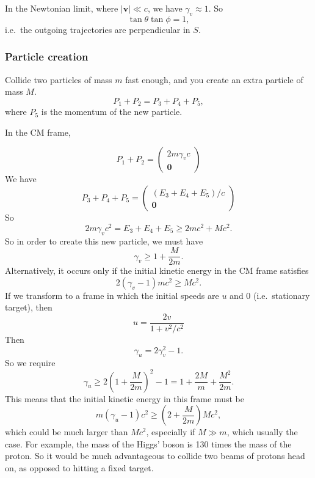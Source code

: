 \documentclass[a4paper]{article}
\begin{document}
In the Newtonian limit, where $|\mathbf{v}| \ll c$, we have $\gamma_v \approx 1$. So
\[
  \tan \theta\tan \phi = 1,
\]
i.e.\ the outgoing trajectories are perpendicular in $S$.

\subsubsection*{Particle creation}
Collide two particles of mass $m$ fast enough, and you create an extra particle of mass $M$.
\[
  P_1 + P_2 = P_3 + P_4 + P_5,
\]
where $P_5$ is the momentum of the new particle.

In the CM frame,
\begin{center}
\end{center}
\[
  P_1 + P_2 =
  \begin{pmatrix}
    2m\gamma_v c\\
    \mathbf{0}
  \end{pmatrix}
\]
We have
\[
  P_3 + P_4 + P_5 =
  \begin{pmatrix}
    (E_3 + E_4 + E_5)/c\\
    \mathbf{0}
  \end{pmatrix}
\]
So
\[
  2m\gamma_v c^2 = E_3 + E_4 + E_5 \geq 2mc^2 + Mc^2.
\]
So in order to create this new particle, we must have
\[
  \gamma_v \geq 1 + \frac{M}{2m}.
\]
Alternatively, it occurs only if the initial kinetic energy in the CM frame satisfies
\[
  2(\gamma_v - 1)mc^2 \geq Mc^2.
\]
If we transform to a frame in which the initial speeds are $u$ and 0 (i.e.\ stationary target), then
\[
  u = \frac{2v}{1 + v^2/c^2}
\]
Then
\[
  \gamma_u = 2\gamma_v^2 - 1.
\]
So we require
\[
  \gamma_u \geq 2\left(1 + \frac{M}{2m}\right)^2 - 1 = 1 + \frac{2M}{m} + \frac{M^2}{2m}.
\]
This means that the initial kinetic energy in this frame must be
\[
  m(\gamma_u - 1)c^2 \geq \left(2 + \frac{M}{2m}\right)Mc^2,
\]
which could be much larger than $Mc^2$, especially if $M\gg m$, which usually the case. For example, the mass of the Higgs' boson is 130 times the mass of the proton. So it would be much advantageous to collide two beams of protons head on, as opposed to hitting a fixed target.
\end{document}
